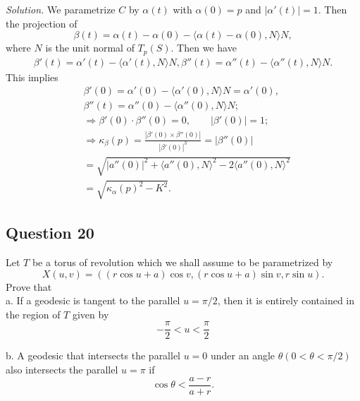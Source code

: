 \documentclass[12pt]{article}
\begin{document}
\textit{Solution.} We parametrize $C$ by $\alpha(t)$ with $\alpha(0)=p$ and $|\alpha'(t)|=1$. Then the projection of 
\begin{equation*}
    \beta(t) = \alpha(t)-\alpha(0) - \langle\alpha(t)-\alpha(0),N\rangle N,
\end{equation*}
where $N$ is the unit normal of $T_p(S)$. Then we have\begin{align*}
    \beta'(t) = \alpha'(t) - \langle\alpha'(t),N\rangle N,
    \beta''(t) = \alpha''(t) - \langle\alpha''(t),N\rangle N.
\end{align*} 
This implies \begin{align*}
    &\beta'(0) = \alpha'(0) - \langle\alpha'(0),N\rangle N = \alpha'(0),\\
    &\beta''(t) = \alpha''(0) - \langle \alpha''(0),N\rangle N;\\
    &\Rightarrow  \beta'(0)\cdot \beta''(0)= 0,\qquad |\beta'(0)|=1;\\
    &\Rightarrow  \kappa_{\beta}(p) =  \frac{|\beta'(0)\times\beta''(0)|}{|\beta'(0)|^3}=|\beta''(0)|\\
    &= \sqrt{|a''(0)|^2+\langle a''(0),N\rangle^2-2\langle a''(0),N\rangle^2}\\
    &=\sqrt{\kappa_\alpha(p)^2-K^2}.
\end{align*}

\subsection*{Question 20}
Let $T$ be a torus of revolution which we shall assume to be parametrized by \begin{equation*}
    X(u, v)=((r\cos u+a)\cos v,(r\cos u+a)\sin v,r\sin u).
\end{equation*}
Prove that\\

a. If a geodesic is tangent to the parallel $u = \pi/2$, then it is entirely contained in the region of $T$ given by\begin{equation*}
    -\frac{\pi}{2}<u<\frac{\pi}{2}
\end{equation*}

b. A geodesic that intersects the parallel $u = 0$ under an angle $\theta (0< \theta < \pi/2)$ also intersects the parallel $u = \pi$ if \begin{equation*}
    \cos \theta < \frac{a-r}{a+r}.
\end{equation*}\\
\end{document}
